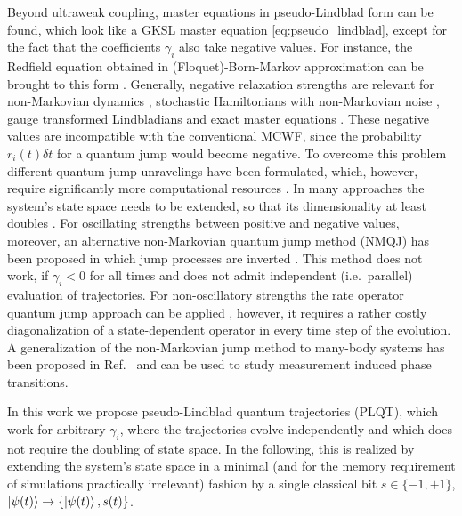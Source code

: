 \documentclass[twocolumn,prl,superscriptaddress]{revtex4-2}
\begin{document}
Beyond ultraweak coupling, master equations in pseudo-Lindblad form can be found, which look like a GKSL master equation \cref{eq:pseudo_lindblad}, except for the fact that the coefficients $\gamma_i$ also take negative values. For instance, the Redfield equation obtained in (Floquet)-Born-Markov approximation can be brought to this form \cite{TBecker2021}. Generally, negative relaxation strengths are relevant for non-Markovian dynamics \cite{DCruscinskiJPiiloWStrunz2017}, stochastic Hamiltonians with non-Markovian noise \cite{Groszkowski2022}, gauge transformed Lindbladians \cite{McDonaldClerk2023arxiv} and exact master equations \cite{KarrleinGrabert97,AShajiECGSudarshan2005,SAlipour2020}. These negative values are incompatible with the conventional MCWF, since the probability $r_i(t) \delta t$ for a quantum jump would become negative. To overcome this problem different quantum jump unravelings have been formulated, which, however, require significantly more computational resources \cite{breuerpetruccione1999,IKondovMschreiber2003,breuer2004,SuessEisfeldStrunz2014,MRHush2015,Piilo2009,KHaerkoenen_2010,KLuoma2020,SmirnePiilo2020}. In many approaches the system’s state space needs to be extended, so that its dimensionality at least doubles \cite{breuerpetruccione1999,IKondovMschreiber2003,breuer2004,ChinRivasHuelgaPlenio2010,SuessEisfeldStrunz2014,MRHush2015,StrasbergSchallerBrandes2016,PolettiSchaller2021}. For oscillating strengths between positive and negative values, moreover, an alternative non-Markovian quantum jump method (NMQJ) has been proposed in which jump processes are inverted \cite{PiiloManiscalco2008,Piilo2009,KHaerkoenen_2010,KLuoma2020}. This method does not work, if $\gamma_i<0$ for all times and does not admit independent (i.e.~parallel) evaluation of trajectories. For non-oscillatory strengths the rate operator quantum jump approach can be applied \cite{SmirnePiilo2020}, however, it requires a rather costly diagonalization of a state-dependent operator in every time step of the evolution. A generalization of the non-Markovian jump method to many-body systems has been proposed in Ref.~\cite{CGiulianoDPoletti2023} and can be used to study measurement induced phase transitions.

In this work we propose pseudo-Lindblad quantum trajectories (PLQT), which work for arbitrary $\gamma_i$, where the trajectories evolve independently and which does not require the doubling of state space. In the following, this is realized by extending the system’s state space in a minimal (and for the memory requirement of simulations practically irrelevant) fashion by a single classical bit $s\in\{-1,+1\}$, $\ket{\psi(t)} \to \{\ket{\psi(t)}, s(t)\}$.
\end{document}
